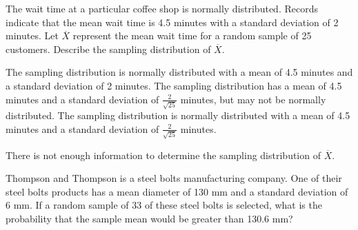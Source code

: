 \documentclass[noanswers]{exam}
\begin{document}
\begin{questions}

\newpage

\question The wait time at a particular coffee shop is normally distributed. Records indicate that the mean wait time is 4.5 minutes with a standard deviation of 2 minutes. Let $\overline{X}$ represent the mean wait time for a random sample of 25 customers. Describe the sampling distribution of $\overline{X}$.

\vspace{3mm}
\begin{choices}
	\choice The sampling distribution is normally distributed with a mean of 4.5 minutes and a standard deviation of 2 minutes.
	\choice The sampling distribution has a mean of 4.5 minutes and a standard deviation of $\frac{2}{\sqrt{25}}$ minutes, but may not be normally distributed.
	\CorrectChoice The sampling distribution is normally distributed with a mean of 4.5 minutes and a standard deviation of $\frac{2}{\sqrt{25}}$ minutes.
	
	\choice There is not enough information to determine the sampling distribution of $\overline{X}$.
\end{choices}
\vspace{3mm}

\question Thompson and Thompson is a steel bolts manufacturing company. One of their steel bolts products has a mean diameter of 130 mm and a standard deviation of 6 mm. If a random sample of 33 of these steel bolts is selected, what is the probability that the sample mean would be greater than 130.6 mm?


\end{questions}
\end{document}
